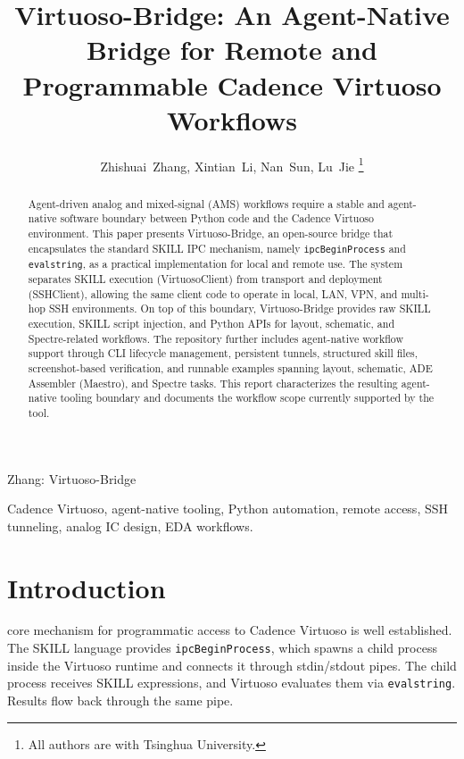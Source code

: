 \documentclass[lettersize,journal]{ieee_template/IEEEtran}
\begin{document}
\title{Virtuoso-Bridge: An Agent-Native Bridge for Remote and Programmable Cadence Virtuoso Workflows}

\author{Zhishuai~Zhang, Xintian~Li, Nan~Sun, Lu~Jie%
\thanks{All authors are with Tsinghua University.}%
}

\markboth{}%
{Zhang: Virtuoso-Bridge}

\maketitle

\begin{abstract}
Agent-driven analog and mixed-signal (AMS) workflows require a stable and agent-native software boundary between Python code and the Cadence Virtuoso environment. This paper presents Virtuoso-Bridge, an open-source bridge that encapsulates the standard SKILL IPC mechanism, namely \texttt{ipcBeginProcess} and \texttt{evalstring}, as a practical implementation for local and remote use. The system separates SKILL execution (VirtuosoClient) from transport and deployment (SSHClient), allowing the same client code to operate in local, LAN, VPN, and multi-hop SSH environments. On top of this boundary, Virtuoso-Bridge provides raw SKILL execution, SKILL script injection, and Python APIs for layout, schematic, and Spectre-related workflows. The repository further includes agent-native workflow support through CLI lifecycle management, persistent tunnels, structured skill files, screenshot-based verification, and runnable examples spanning layout, schematic, ADE Assembler (Maestro), and Spectre tasks. This report characterizes the resulting agent-native tooling boundary and documents the workflow scope currently supported by the tool.
\end{abstract}

\begin{IEEEkeywords}
Cadence Virtuoso, agent-native tooling, Python automation, remote access, SSH tunneling, analog IC design, EDA workflows.
\end{IEEEkeywords}

\section{Introduction}
 core mechanism for programmatic access to Cadence Virtuoso is well established. The SKILL language provides \texttt{ipcBeginProcess}, which spawns a child process inside the Virtuoso runtime and connects it through stdin/stdout pipes. The child process receives SKILL expressions, and Virtuoso evaluates them via \texttt{evalstring}. Results flow back through the same pipe.
\end{document}
